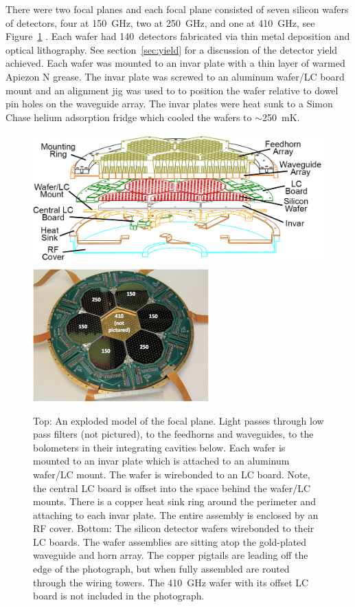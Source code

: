 
There were two focal planes and each focal plane consisted of seven silicon wafers of detectors, four at 150~GHz, two at 250~GHz, and one at 410~GHz, see Figure~\ref{fig:focal_plane} \cite{EBEXPaper2}.
Each wafer had 140~detectors fabricated via thin metal deposition and optical lithography. 
See section~\ref{sec:yield} for a discussion of the detector yield achieved.  
Each wafer was mounted to an invar plate with a thin layer of warmed Apiezon N grease. 
The invar plate was screwed to an aluminum wafer/LC board mount and an alignment jig was used to to position the wafer relative to dowel pin holes on the waveguide array. 
The invar plates were heat sunk to a Simon Chase helium adsorption fridge which cooled the wafers to $\sim$250~mK.  

\begin{figure}[htbp]
\begin{center}
\includegraphics[height=2.0in]{figures/focal_plane_outline_central_labeled.png}
\includegraphics[height=2.0in]{figures/focal_plane_photo.png}
\caption[EBEX focal plane]{Top: An exploded model of the focal plane. Light passes through low pass filters (not pictured), to the feedhorns and waveguides, to the bolometers in their integrating cavities below. Each wafer is mounted to an invar plate which is attached to an aluminum wafer/\ac{LC} mount. The wafer is wirebonded to an \ac{LC} board. Note, the central \ac{LC} board is offset into the space behind the wafer/\ac{LC} mounts. There is a copper heat sink ring around the perimeter and attaching to each invar plate. The entire assembly is enclosed by an RF cover. Bottom: The silicon detector wafers wirebonded to their \ac{LC} boards. The wafer assemblies are sitting atop the gold-plated waveguide and horn array. The copper pigtails are leading off the edge of the photograph, but when fully assembled are routed through the wiring towers. The 410~GHz wafer with its offset \ac{LC} board is not included in the photograph. 
\label{fig:focal_plane} }
\end{center}
\end{figure}

